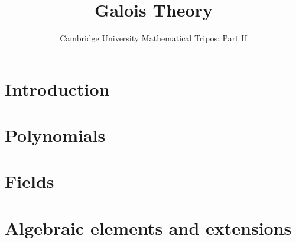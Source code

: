 \documentclass{article}
\title{Galois Theory}
\author{Cambridge University Mathematical Tripos: Part II}
\begin{document}
\maketitle

\tableofcontentsnewpage{}

\section{Introduction}

\section{Polynomials}

\section{Fields}

\section{Algebraic elements and extensions}

\end{document}
